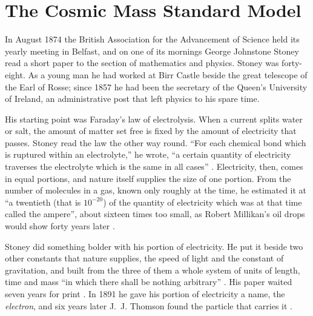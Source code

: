 \chapter{The Cosmic Mass Standard Model}\label{ch:standard-model}



In August 1874 the British Association for the Advancement of Science held its yearly meeting in Belfast, and on one of its mornings George Johnstone Stoney read a short paper to the section of mathematics and physics. Stoney was forty-eight. As a young man he had worked at Birr Castle beside the great telescope of the Earl of Rosse; since 1857 he had been the secretary of the Queen's University of Ireland, an administrative post that left physics to his spare time.

His starting point was Faraday's law of electrolysis. When a current splits water or salt, the amount of matter set free is fixed by the amount of electricity that passes. Stoney read the law the other way round. \enquote{For each chemical bond which is ruptured within an electrolyte,} he wrote, \enquote{a certain quantity of electricity traverses the electrolyte which is the same in all cases} \citep{Stoney1894}. Electricity, then, comes in equal portions, and nature itself supplies the size of one portion. From the number of molecules in a gas, known only roughly at the time, he estimated it at \enquote{a twentieth (that is $10^{-20}$) of the quantity of electricity which was at that time called the ampere}, about sixteen times too small, as Robert Millikan's oil drops would show forty years later \citep{Millikan1913}.

Stoney did something bolder with his portion of electricity. He put it beside two other constants that nature supplies, the speed of light and the constant of gravitation, and built from the three of them a whole system of units of length, time and mass \enquote{in which there shall be nothing arbitrary} \citep{Stoney1894}. His paper waited seven years for print \citep{Stoney1881}. In 1891 he gave his portion of electricity a name, the \emph{electron}, and six years later J.~J. Thomson found the particle that carries it \citep{Thomson1897}.

